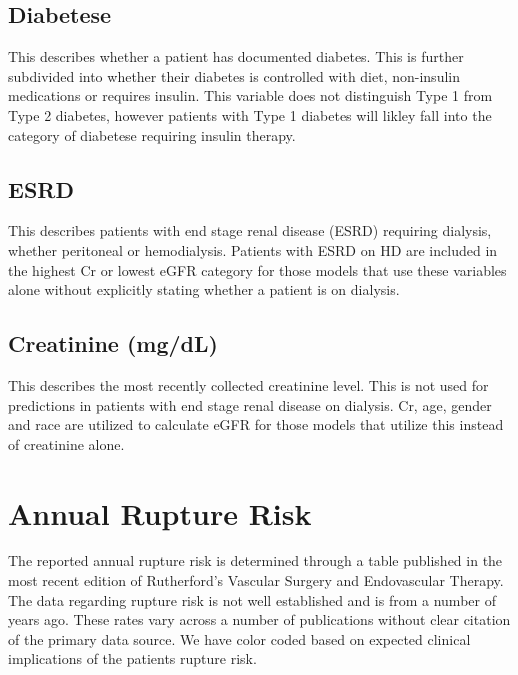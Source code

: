 \documentclass[
]{book}
\begin{document}
\hypertarget{diabetese}{%
\subsection{Diabetese}\label{diabetese}}

This describes whether a patient has documented diabetes. This is further subdivided into whether their diabetes is controlled with diet, non-insulin medications or requires insulin. This variable does not distinguish Type 1 from Type 2 diabetes, however patients with Type 1 diabetes will likley fall into the category of diabetese requiring insulin therapy.

\hypertarget{esrd}{%
\subsection{ESRD}\label{esrd}}

This describes patients with end stage renal disease (ESRD) requiring dialysis, whether peritoneal or hemodialysis. Patients with ESRD on HD are included in the highest Cr or lowest eGFR category for those models that use these variables alone without explicitly stating whether a patient is on dialysis.

\hypertarget{creatinine-mgdl}{%
\subsection{Creatinine (mg/dL)}\label{creatinine-mgdl}}

This describes the most recently collected creatinine level. This is not used for predictions in patients with end stage renal disease on dialysis. Cr, age, gender and race are utilized to calculate eGFR for those models that utilize this instead of creatinine alone.

\hypertarget{annual-rupture-risk}{%
\section{Annual Rupture Risk}\label{annual-rupture-risk}}

The reported annual rupture risk is determined through a table published in the most recent edition of Rutherford's Vascular Surgery and Endovascular Therapy. \citet{tracciAortoiliacAneurysmsEvaluation} The data regarding rupture risk is not well established and is from a number of years ago. These rates vary across a number of publications without clear citation of the primary data source. We have color coded based on expected clinical implications of the patients rupture risk.
\end{document}
